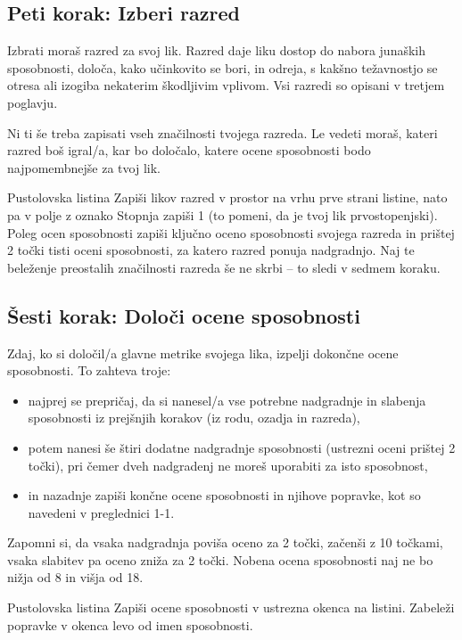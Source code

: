\subsection{Peti korak: Izberi razred}
Izbrati moraš razred za svoj lik. Razred daje liku dostop do nabora junaških sposobnosti, določa, kako učinkovito se bori, in odreja, s kakšno težavnostjo se otresa ali izogiba nekaterim škodljivim vplivom. Vsi razredi so opisani v tretjem poglavju.

Ni ti še treba zapisati vseh značilnosti tvojega razreda. Le vedeti moraš, kateri razred boš igral/a, kar bo določalo, katere ocene sposobnosti bodo najpomembnejše za tvoj lik.

\begin{rpg-titlebox}{Pustolovska listina}
    Zapiši likov razred v prostor na vrhu prve strani listine, nato pa v polje z oznako Stopnja zapiši 1 (to pomeni, da je tvoj lik prvostopenjski). Poleg ocen sposobnosti zapiši ključno oceno sposobnosti svojega razreda in prištej 2 točki tisti oceni sposobnosti, za katero razred ponuja nadgradnjo. Naj te beleženje preostalih značilnosti razreda še ne skrbi -- to sledi v sedmem koraku.
\end{rpg-titlebox}

\subsection{Šesti korak: Določi ocene sposobnosti}
Zdaj, ko si določil/a glavne metrike svojega lika, izpelji dokončne ocene sposobnosti. To zahteva troje:

\begin{itemize}
    \item najprej se prepričaj, da si nanesel/a vse potrebne nadgradnje in slabenja sposobnosti iz prejšnjih korakov (iz rodu, ozadja in razreda),
    \item potem nanesi še štiri dodatne nadgradnje sposobnosti (ustrezni oceni prištej 2 točki), pri čemer dveh nadgradenj ne moreš uporabiti za isto sposobnost,
    \item in nazadnje zapiši končne ocene sposobnosti in njihove popravke, kot so navedeni v preglednici 1-1.
\end{itemize}

Zapomni si, da vsaka nadgradnja poviša oceno za 2 točki, začenši z 10 točkami, vsaka slabitev pa oceno zniža za 2 točki. Nobena ocena sposobnosti naj ne bo nižja od 8 in višja od 18.

\begin{rpg-titlebox}{Pustolovska listina}
    Zapiši ocene sposobnosti v ustrezna okenca na listini. Zabeleži popravke v okenca levo od imen sposobnosti.
\end{rpg-titlebox}

